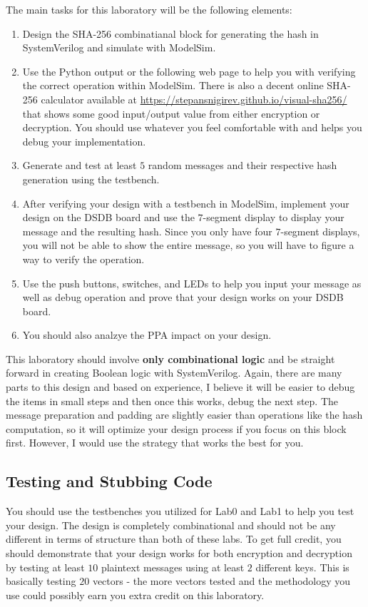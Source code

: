 \documentclass{article}
\begin{document}
The main tasks for this laboratory
will be the following elements:
\begin{enumerate}
  \item Design the SHA-256 combinatianal block for generating the hash
    in SystemVerilog and simulate with ModelSim.
  \item Use the Python output or the following web page to help you with verifying the
    correct operation within ModelSim.
    There is also a decent online
    SHA-256 calculator available at \url{https://stepansnigirev.github.io/visual-sha256/} that
    shows some good input/output value from either encryption or
    decryption.  You should use whatever you feel comfortable with and
    helps you debug your implementation.
  \item Generate and test at least $5$ random messages and their respective hash generation
    using the testbench.
  \item After verifying your design with a testbench in ModelSim,
    implement your design on the DSDB board and use the    
    $7$-segment display to display your message and the resulting hash.
    Since you only have four $7$-segment displays, you will not be
    able to show the entire message, so you will
    have to figure a way to verify the operation.
  \item Use the push buttons, switches, and LEDs to help you input
    your message as well as debug operation and prove that your
    design works on your DSDB board.
    \item You should also analzye the PPA impact on your design. 
\end{enumerate}
This laboratory should involve \textbf{only combinational logic} and be
straight forward in creating Boolean logic with SystemVerilog.
Again, there are many parts to this design and based on experience, I
believe it will be easier to debug the items in small steps and then
once this works, debug the next step.  The message preparation and
padding are slightly easier than operations like the hash computation,
so it will optimize your design process if you focus on this block
first.  However, I would use the strategy that works the best for you.

\subsection{Testing and Stubbing Code}

You should use the testbenches you utilized for Lab0 and Lab1 to help
you test your design.  The design is completely combinational and
should not be any different in terms of structure than both of these
labs.  To get full credit, you should demonstrate that your design
works for both encryption and decryption by testing at least $10$
plaintext messages using at least $2$ different keys.  This is
basically testing $20$ vectors - the more vectors tested and the
methodology you use could possibly
earn you extra credit on this laboratory.
\end{document}
